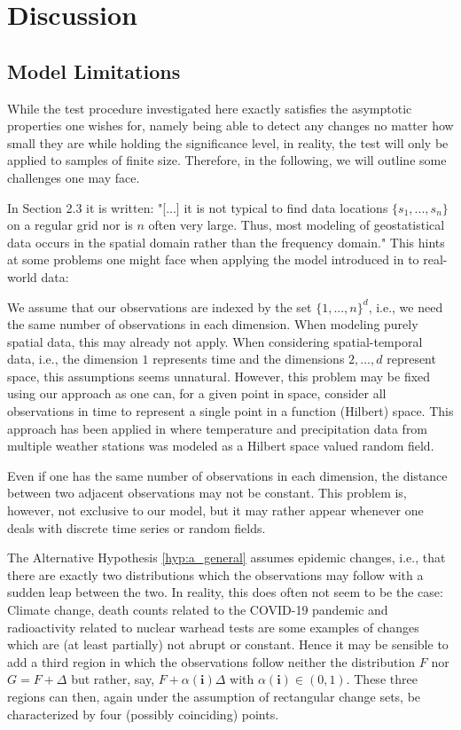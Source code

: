 \section{Discussion}

\subsection{Model Limitations}

While the test procedure investigated here exactly satisfies the asymptotic properties one wishes for, namely being able to detect any changes no matter how small they are while holding the significance level, in reality, the test will only be applied to samples of finite size. Therefore, in the following, we will outline some challenges one may face.

In \cite{cressie1993spatialstatistics} Section 2.3 it is written: "[...] it is not typical to find data locations $\{s_1, ..., s_n\}$ on a regular grid nor is $n$ often very large. Thus, most modeling of geostatistical data occurs in the spatial domain rather than the frequency domain." This hints at some problems one might face when applying the model introduced in \cite{[0]BUCCHIA2017344} to real-world data:

We assume that our observations are indexed by the set $\{1, ..., n\}^d$, i.e., we need the same number of observations in each dimension. When modeling purely spatial data, this may already not apply. When considering spatial-temporal data, i.e., the dimension $1$ represents time and the dimensions $2, ..., d$ represent space, this assumptions seems unnatural. However, this problem may be fixed using our approach as one can, for a given point in space, consider all observations in time to represent a single point in a function (Hilbert) space. This approach has been applied in \cite{[22]gromenko2012testing} where temperature and precipitation data from multiple weather stations was modeled as a Hilbert space valued random field.

Even if one has the same number of observations in each dimension, the distance between two adjacent observations may not be constant. This problem is, however, not exclusive to our model, but it may rather appear whenever one deals with discrete time series or random fields.

The Alternative Hypothesis \ref{hyp:a_general} assumes epidemic changes, i.e., that there are exactly two distributions which the observations may follow with a sudden leap between the two. In reality, this does often not seem to be the case: Climate change, death counts related to the COVID-19 pandemic and radioactivity related to nuclear warhead tests are some examples of changes which are (at least partially) not abrupt or constant. Hence it may be sensible to add a third region in which the observations follow neither the distribution $F$ nor $G = F + \Delta$ but rather, say, $F + \alpha(\mathbf{i}) \Delta$ with $\alpha(\mathbf{i}) \in (0, 1)$. These three regions can then, again under the assumption of rectangular change sets, be characterized by four (possibly coinciding) points.

